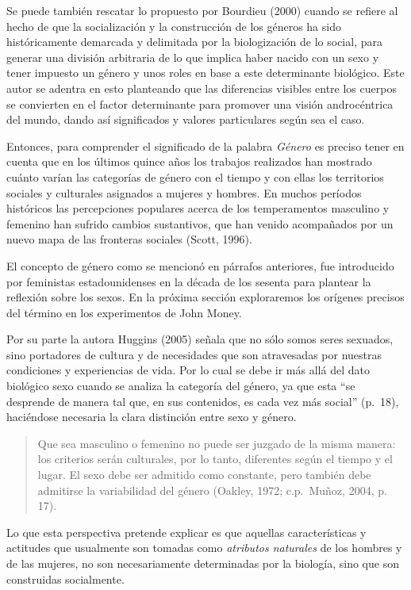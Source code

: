 Se puede también rescatar lo propuesto por Bourdieu (2000) cuando se refiere
al hecho de que la socialización y la construcción de los géneros ha sido
históricamente demarcada y delimitada por la biologización de lo social, para
generar una división arbitraria de lo que implica haber nacido con un sexo y
tener impuesto un género y unos roles en base a este determinante biológico.
Este autor se adentra en esto planteando que las diferencias visibles entre los
cuerpos se convierten en el factor determinante para promover una visión
androcéntrica del mundo, dando así significados y valores particulares según sea
el caso.

Entonces, para comprender el significado de la palabra \emph{Género} es
preciso tener en cuenta que en los últimos quince años los trabajos
realizados han mostrado cuánto varían las categorías de género con el tiempo y
con ellas los territorios sociales y culturales asignados a mujeres y hombres.
En muchos períodos históricos las percepciones populares acerca de los
temperamentos masculino y femenino han sufrido cambios sustantivos, que han
venido acompañados por un nuevo mapa de las fronteras sociales (Scott, 1996).

El concepto de género como se mencionó en párrafos anteriores, fue introducido
por feministas estadounidenses en la década de los sesenta para plantear la
reflexión sobre los sexos.
En la próxima sección exploraremos los orígenes precisos del término en los
experimentos de John Money.

Por su parte la autora Huggins (2005) señala que no sólo somos seres sexuados,
sino portadores de cultura y de necesidades que son atravesadas por nuestras
condiciones y experiencias de vida.
Por lo cual se debe ir más allá del dato biológico sexo cuando se analiza la
categoría del género, ya que esta “se desprende de manera tal que, en sus
contenidos, es cada vez más social” (p.~18), haciéndose necesaria la clara
distinción entre sexo y género.

\begin{quote}
    Que sea masculino o femenino no puede ser juzgado de la misma manera: los
    criterios serán culturales, por lo tanto, diferentes según el tiempo y el
    lugar.
    El sexo debe ser admitido como constante, pero también debe admitirse la
    variabilidad del género (Oakley, 1972; c.p.~Muñoz, 2004, p. 17).
\end{quote}

Lo que esta perspectiva pretende explicar es que aquellas características y
actitudes que usualmente son tomadas como \emph{atributos naturales} de los
hombres y de las mujeres, no son necesariamente determinadas por la biología,
sino que son construidas socialmente.

